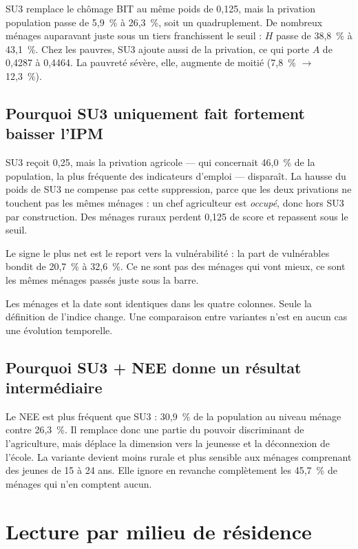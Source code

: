 \documentclass[11pt,a4paper]{article}
\begin{document}
SU3 remplace le chômage BIT au même poids de 0,125, mais la privation population passe de
5,9~\% à 26,3~\%, soit un quadruplement. De nombreux ménages auparavant juste sous un tiers
franchissent le seuil : $H$ passe de 38,8~\% à 43,1~\%. Chez les pauvres, SU3 ajoute aussi de la
privation, ce qui porte $A$ de 0,4287 à 0,4464. La pauvreté sévère, elle, augmente de moitié
(7,8~\% $\rightarrow$ 12,3~\%).

\subsection{Pourquoi SU3 uniquement fait fortement baisser l'IPM}

SU3 reçoit 0,25, mais la privation agricole --- qui concernait 46,0~\% de la population, la plus
fréquente des indicateurs d'emploi --- disparaît. La hausse du poids de SU3 ne compense pas
cette suppression, parce que les deux privations ne touchent pas les mêmes ménages : un chef
agriculteur est \emph{occupé}, donc hors SU3 par construction. Des ménages ruraux perdent 0,125
de score et repassent sous le seuil.

Le signe le plus net est le report vers la vulnérabilité : la part de vulnérables bondit de
20,7~\% à 32,6~\%. Ce ne sont pas des ménages qui vont mieux, ce sont les mêmes ménages passés
juste sous la barre.

\begin{attention}
Les ménages et la date sont identiques dans les quatre colonnes. Seule la définition de l'indice
change. Une comparaison entre variantes n'est en aucun cas une évolution temporelle.
\end{attention}

\subsection{Pourquoi SU3 + NEE donne un résultat intermédiaire}

Le NEE est plus fréquent que SU3 : 30,9~\% de la population au niveau ménage contre 26,3~\%. Il
remplace donc une partie du pouvoir discriminant de l'agriculture, mais déplace la dimension
vers la jeunesse et la déconnexion de l'école. La variante devient moins rurale et plus sensible
aux ménages comprenant des jeunes de 15 à 24 ans. Elle ignore en revanche complètement les
45,7~\% de ménages qui n'en comptent aucun.

\section{Lecture par milieu de résidence}
\end{document}
